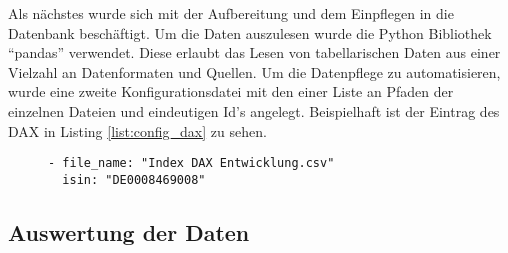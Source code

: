 Als nächstes wurde sich mit der Aufbereitung und dem Einpflegen in die Datenbank beschäftigt. Um die Daten auszulesen wurde die Python Bibliothek \enquote{pandas} verwendet. Diese erlaubt das Lesen von tabellarischen Daten aus einer Vielzahl an Datenformaten und Quellen. Um die Datenpflege zu automatisieren, wurde eine zweite Konfigurationsdatei mit den einer Liste an Pfaden der einzelnen Dateien und eindeutigen Id's angelegt. Beispielhaft ist der Eintrag des DAX in Listing \ref{list:config_dax} zu sehen.

\begin{figure}[!htb]
    \begin{lstlisting}[caption=Konfigeintrag des DAX, label=list:config_dax]
- file_name: "Index DAX Entwicklung.csv"
  isin: "DE0008469008"
    \end{lstlisting}
\end{figure}


\subsection{Auswertung der Daten}

\clearpage